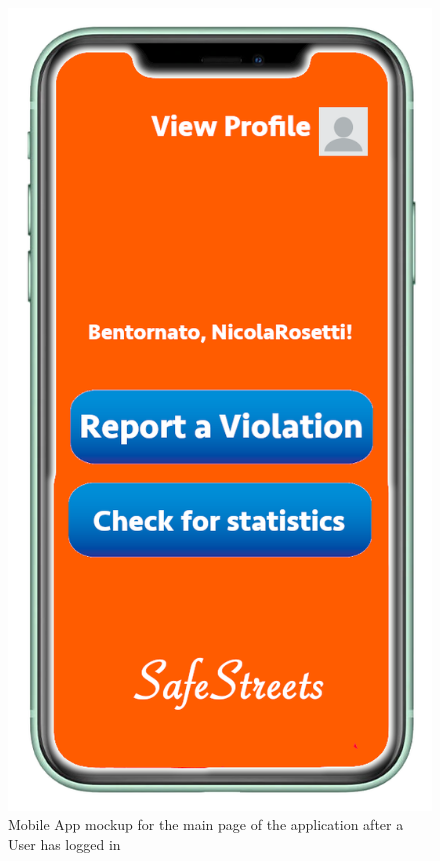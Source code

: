 \documentclass[a4paper]{report}
\begin{document}
\begin{figure}
\begin{minipage}{.45\textwidth}
\includegraphics[width=.7\linewidth]{mockups/Schermata_principale.png}
\caption[Mobile App mockup for main page]{Mobile App mockup for the main page of the application after a User has logged in }
\label{fig:main-screen}
\end{minipage}
\end{figure}
\end{document}
